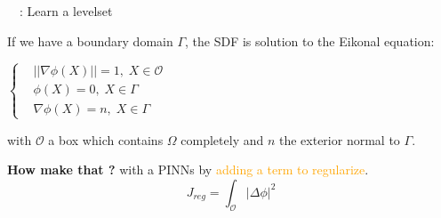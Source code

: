 \begin{frame}{\appendixname~\theappendixframenumber~: Learn a levelset}
	\vspace{-10pt}
	\begin{tcolorbox}[
		colback=other, %
		colframe=other, %
		arc=2mm, %
		boxrule=0.5pt, %
		breakable, enhanced jigsaw,
		width=\linewidth,
		opacityback=0.1
		]
		
		If we have a boundary domain $\Gamma$, the SDF is solution to the Eikonal equation:
		
		\begin{minipage}{\linewidth}
			\centering
			$\left\{\begin{aligned}
				&||\nabla\phi(X)||=1, \; X\in\mathcal{O} \\
				&\phi(X)=0, \; X\in\Gamma \\
				&\nabla\phi(X)=n, \; X\in\Gamma
			\end{aligned}\right.$
		\end{minipage}
		
		with $\mathcal{O}$ a box which contains $\Omega$ completely and $n$ the exterior normal to $\Gamma$.
	\end{tcolorbox}
	
	\textbf{How make that ?} with a PINNs \footnotesize\citep{clemot_neural_2023}\normalsize by \textcolor{orange}{adding a term to regularize}.
	\vspace{-5pt}
	\begin{equation*}
		J_{reg} = \int_\mathcal{O} |\Delta\phi|^2
	\end{equation*}

	\begin{minipage}{0.32\linewidth}
		\centering
	\end{minipage} 
	\begin{minipage}{0.32\linewidth}
		\centering
	\end{minipage} 
	\begin{minipage}{0.32\linewidth}
		\centering
	\end{minipage}
\end{frame}


